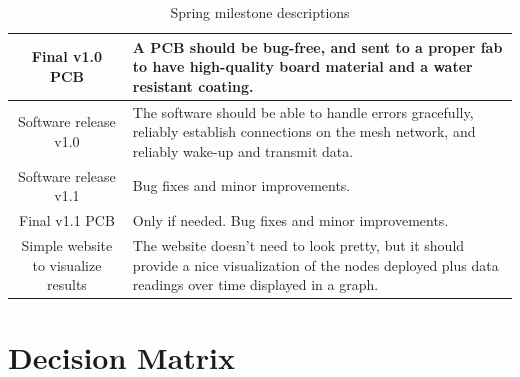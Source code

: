 \documentclass[titlepage, 11pt, letterpaper]{article}
\begin{document}
\begin{table}[H]
\begin{tabularx}{\linewidth}{|c|X|}
        \hline
        Final v1.0 PCB
        & A PCB should be bug-free, and sent to a proper fab to have high-quality board material and a water resistant coating.
        \\
        
        \hline
        Software release v1.0
        & The software should be able to handle errors gracefully, reliably establish connections on the mesh network, and reliably wake-up and transmit data.
        \\ 
        
        \hline
        Software release v1.1
        & Bug fixes and minor improvements.
        \\ 
        
        \hline
        Final v1.1 PCB
        & Only if needed. Bug fixes and minor improvements.
        \\
        
        \hline
        Simple website to visualize results
        & The website doesn't need to look pretty, but it should provide a nice visualization of the nodes deployed plus data readings over time displayed in a graph.
        \\
        
        \hline
    \end{tabularx}
    \caption{Spring milestone descriptions}
\end{table}

\section{Decision Matrix}
\end{document}
